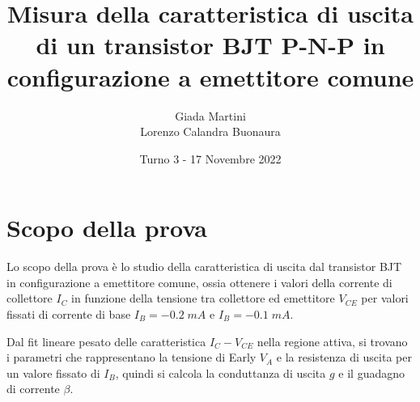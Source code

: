 \documentclass[a4paper, 11pt]{article}
\title{\textbf{Misura della caratteristica di uscita di un transistor BJT P-N-P in configurazione a emettitore comune}}
\author{Giada Martini \\ Lorenzo Calandra Buonaura}
\date{Turno 3 - 17 Novembre 2022}
\begin{document}
\maketitle

\section{Scopo della prova}
Lo scopo della prova è lo studio della caratteristica di uscita dal transistor BJT in configurazione a emettitore comune, ossia ottenere i valori della corrente di collettore $I_C$ in funzione della tensione tra collettore ed emettitore $V_{CE}$  per valori fissati di corrente di base $I_B = -0.2 \; mA $ e $I_B = -0.1 \; mA$. 

Dal fit lineare pesato delle caratteristica $I_C-V_{CE}$ nella regione attiva, si trovano i parametri che rappresentano la tensione di Early $V_A$ e la resistenza di uscita per un valore fissato di $I_B$, quindi si calcola la conduttanza di uscita $g$ e il guadagno di corrente $\beta$. 
\end{document}
